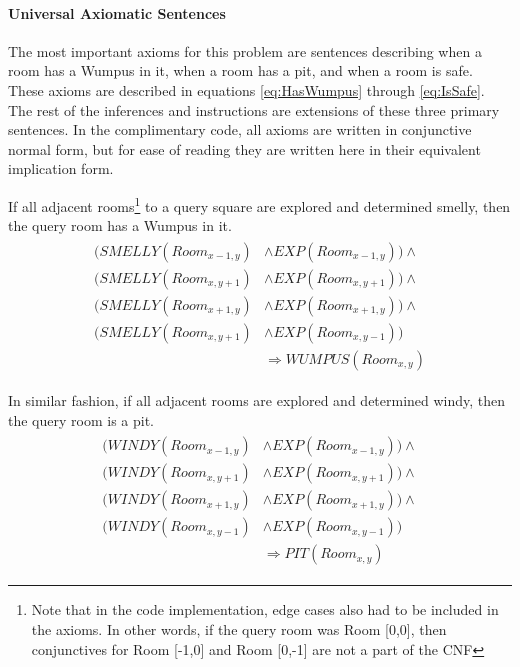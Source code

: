 \paragraph{Universal Axiomatic Sentences}
The most important axioms for this problem are sentences describing when a room has a Wumpus in it, when a room has a pit, and when a room is safe.
These axioms are described in equations \ref{eq:HasWumpus} through \ref{eq:IsSafe}.
The rest of the inferences and instructions are extensions of these three primary sentences.
In the complimentary code, all axioms are written in conjunctive normal form, but for ease of reading they are written here in their equivalent implication form.

If all adjacent rooms\footnote{Note that in the code implementation, edge cases also had to be included in the axioms. In other words, if the query room was Room [0,0], then conjunctives for Room [-1,0] and Room [0,-1] are not a part of the CNF} to a query square are explored and determined smelly, then the query room has a Wumpus in it.
\begin{align}\label{eq:HasWumpus}
\begin{split}
	(SMELLY(Room_{x-1,y}) &\land EXP(Room_{x-1,y})) \land \\
    (SMELLY(Room_{x,y+1}) &\land EXP(Room_{x,y+1})) \land \\
    (SMELLY(Room_{x+1,y}) &\land EXP(Room_{x+1,y})) \land \\
    (SMELLY(Room_{x,y+1}) &\land EXP(Room_{x,y-1})) \\
    &\Rightarrow WUMPUS(Room_{x,y})
\end{split}
\end{align}

In similar fashion, if all adjacent rooms are explored and determined windy, then the query room is a pit.
\begin{align}\label{eq:HasPit}
\begin{split}
	(WINDY(Room_{x-1,y}) &\land EXP(Room_{x-1,y})) \land \\
    (WINDY(Room_{x,y+1}) &\land EXP(Room_{x,y+1})) \land \\
    (WINDY(Room_{x+1,y}) &\land EXP(Room_{x+1,y})) \land \\
    (WINDY(Room_{x,y-1}) &\land EXP(Room_{x,y-1})) \\
    &\Rightarrow PIT(Room_{x,y})
\end{split}
\end{align}

